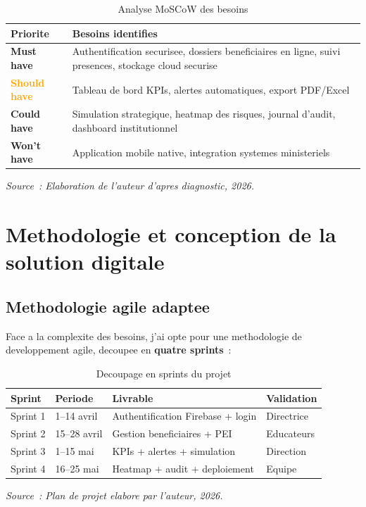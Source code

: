 \documentclass[12pt,a4paper,openany]{report}
\begin{document}
\begin{table}[H]
\centering
\caption{Analyse MoSCoW des besoins}
\label{tab:moscow}
\begin{tabularx}{\textwidth}{lX}
\toprule
\textbf{Priorite} & \textbf{Besoins identifies}\\
\midrule
\textcolor{rougeKO}{\bfseries Must have} &
  Authentification securisee, dossiers beneficiaires en ligne,
  suivi presences, stockage cloud securise\\
\midrule
\textcolor{orange}{\bfseries Should have} &
  Tableau de bord KPIs, alertes automatiques, export PDF/Excel\\
\midrule
\textcolor{bleu}{\bfseries Could have} &
  Simulation strategique, heatmap des risques, journal d'audit,
  dashboard institutionnel\\
\midrule
\textcolor{grisTxt}{\bfseries Won't have} &
  Application mobile native, integration systemes ministeriels\\
\bottomrule
\end{tabularx}
\vspace{0.1cm}
\small\textit{Source~: Elaboration de l'auteur d'apres diagnostic, 2026.}
\end{table}

\chapter{Methodologie et conception de la solution digitale}

\section{Methodologie agile adaptee}

Face a la complexite des besoins, j'ai opte pour une methodologie
de developpement agile, decoupee en \textbf{quatre sprints}~:

\begin{table}[H]
\centering
\caption{Decoupage en sprints du projet}
\label{tab:sprints}
\begin{tabularx}{\textwidth}{llXl}
\toprule
\textbf{Sprint} & \textbf{Periode} & \textbf{Livrable} & \textbf{Validation}\\
\midrule
Sprint 1 & 1--14 avril & Authentification Firebase + login & Directrice\\
Sprint 2 & 15--28 avril & Gestion beneficiaires + PEI & Educateurs\\
Sprint 3 & 1--15 mai & KPIs + alertes + simulation & Direction\\
Sprint 4 & 16--25 mai & Heatmap + audit + deploiement & Equipe\\
\bottomrule
\end{tabularx}
\vspace{0.1cm}
\small\textit{Source~: Plan de projet elabore par l'auteur, 2026.}
\end{table}
\end{document}
